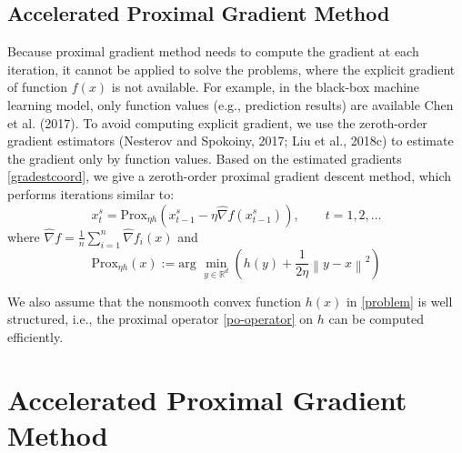 \documentclass{article}
\newcommand*{\R}{\mathbb{R}}
\newcommand*{\Po}{\text{Prox}}
\newcommand{\norm}[1]{\left\lVert#1\right\rVert}
\theoremstyle{definition}
\theoremstyle{remark}
\begin{document}
\subsection{Accelerated Proximal Gradient Method}
{\color{Green}
Because proximal gradient method \cite{} needs to compute
the gradient at each iteration, it cannot be applied to solve the problems, where the explicit gradient of function $f(x)$ is
not available. For example, in the black-box machine learning model, only function values (e.g., prediction results) are
available Chen et al. (2017). To avoid computing explicit gradient, we use the zeroth-order gradient estimators (Nesterov and Spokoiny, 2017; Liu et al., 2018c) to estimate the
gradient only by function values.
Based on the estimated gradients \eqref{gradestcoord}, we give a zeroth-order proximal gradient descent method, which performs  iterations similar to:
\begin{equation}
x_{t}^s= \Po_{\eta h}(x_{t-1}^s - \eta \hat{\nabla} f(x_{t-1}^s)),\qquad t=1, 2, \ldots
\end{equation}
where $\hat{\nabla} f=\frac{1}{n}\sum_{i=1}^n \hat{\nabla} f_i(x)$ and 
\begin{equation}\label{po-operator}
\Po_{\eta h}(x) := \text{arg}\,\,\min_{y\in\R^d}\left(h(y)+\frac{1}{2\eta}\norm{y-x}^2\right)
\end{equation}
}
{\color{Green}


{\color{Violet}
We also assume that the
nonsmooth convex function $h(x)$ in \eqref{problem} is well structured, i.e., the proximal operator \eqref{po-operator} on $h$ can be computed efficiently.

}
}
\section{Accelerated Proximal Gradient Method}
\end{document}
